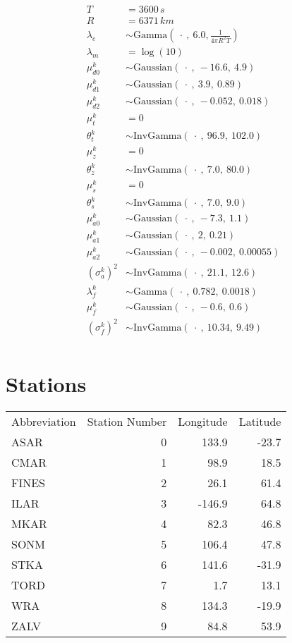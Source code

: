 \documentclass[12pt,letterpaper,onecolumn,oneside]{article}
\begin{document}
\begin{align*}
T & = 3600 \, s \\
R & = 6371 \, km \\
\lambda_e & \sim \text{Gamma}(\ \cdot \ , \ 6.0, \frac{1}{4 \pi R^2 T}) \\
\lambda_m & = \log(10) \\
\mu^k_{d0} & \sim \text{Gaussian}(\ \cdot \ , \ -16.6,\ 4.9) \\
\mu^k_{d1} & \sim \text{Gaussian}(\ \cdot \ , \ 3.9,\ 0.89) \\
\mu^k_{d2} & \sim \text{Gaussian}(\ \cdot \ , \ -0.052,\ 0.018) \\
\mu_t^k & = 0 \\
\theta_t^k & \sim \text{InvGamma}(\ \cdot \ , \ 96.9, \ 102.0) \\
\mu_z^k & = 0 \\
\theta_z^k & \sim \text{InvGamma}(\ \cdot \ , \ 7.0, \ 80.0) \\
\mu_s^k & = 0 \\
\theta_s^k & \sim \text{InvGamma}(\ \cdot \ , \ 7.0, \ 9.0) \\
\mu^k_{a0} & \sim \text{Gaussian}(\ \cdot \ , \  -7.3, \ 1.1) \\
\mu^k_{a1} & \sim \text{Gaussian}(\ \cdot \ , \  2, \ 0.21) \\
\mu^k_{a2} & \sim \text{Gaussian}(\ \cdot \ , \  -0.002, \ 0.00055) \\
(\sigma^k_a)^2 & \sim \text{InvGamma}(\ \cdot \ , \  21.1, \ 12.6) \\
\lambda^k_f & \sim \text{Gamma}(\ \cdot \ , \  0.782, \ 0.0018) \\
\mu^k_f & \sim \text{Gaussian}(\ \cdot \ , \  -0.6, \ 0.6) \\
(\sigma^k_f)^2 & \sim \text{InvGamma}(\ \cdot \ , \  10.34, \ 9.49) \\
\end{align*}

\section{Stations}

\begin{tabular}{lrrr}
Abbreviation & Station Number & Longitude & Latitude \\
ASAR & 0 & 133.9 & -23.7 \\
CMAR & 1 & 98.9 & 18.5 \\
FINES & 2 & 26.1 & 61.4 \\
ILAR & 3 & -146.9 & 64.8 \\
MKAR & 4 & 82.3 & 46.8 \\
SONM & 5 & 106.4 & 47.8 \\
STKA & 6 & 141.6 & -31.9 \\
TORD & 7 & 1.7 & 13.1 \\
WRA & 8 & 134.3 & -19.9 \\
ZALV & 9 & 84.8 & 53.9 \\ 
\end{tabular}
\end{document}
